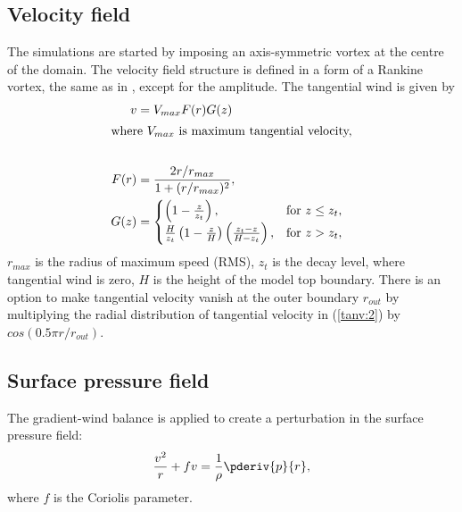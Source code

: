 \subsection{Velocity field}
The simulations are started by imposing an axis-symmetric vortex at the centre of the domain. The velocity field structure is defined in a form of a Rankine vortex, the same as in \cite{EmanuelRotunno89}, except for the amplitude. The tangential wind is given by
\begin{subequations}\label{tanv:0}
\begin{align}
v&=V_{max}F(r)G(z) \label{tanv:1}\\
\intertext{where $V_{max}$ is maximum tangential velocity,} \nonumber \\
F(r)&=\frac{2r/r_{max}}{1+(r/r_{max})^2}, \label{tanv:2}\\
G(z)&= 
\begin{cases}
      \left(1-\frac{z}{z_t}\right), & \text{for}\ z\leq z_t, \\
      \frac{H}{z_t}\left(1-\frac{z}{H}\right)\left(\frac{z_t-z}{H-z_t}\right), & \text{for}\ z>z_t,
\end{cases} \label{tanv:3}
\end{align}
\end{subequations}
$r_{max}$ is the radius of maximum speed (RMS), $z_t$ is the decay level, where tangential wind is zero, $H$ is the height of the model top boundary. There is an option to make tangential velocity vanish at the outer boundary $r_{out}$ by multiplying the radial distribution of tangential velocity in (\ref{tanv:2}) by $cos(0.5\pi r/r_{out})$.

\subsection{Surface pressure field}
The gradient-wind balance is applied to create a perturbation in the surface pressure field:
\begin{equation}
\frac{v^2}{r}+fv=\frac{1}{\rho}\pderiv{p}{r}, \label{pgradwind}
\end{equation}
where $f$ is the Coriolis parameter.

